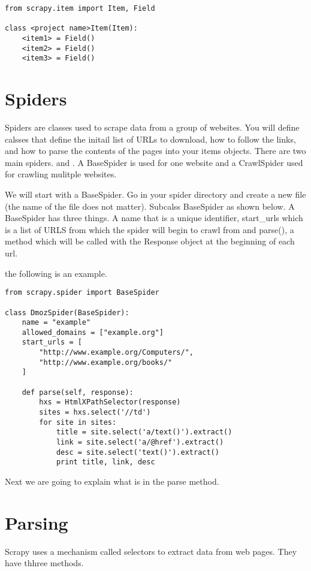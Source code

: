 \begin{lstlisting}
from scrapy.item import Item, Field

class <project name>Item(Item):
    <item1> = Field()
    <item2> = Field()
    <item3> = Field()
\end{lstlisting}

\section*{Spiders}
Spiders are classes used to scrape data from a group of websites. You will define calsses that define the initail list of URLs to download, how to follow the links, and how to parse the contents of the pages into your items objects. There are two main spiders.  and . A BaseSpider is used for one website and a CrawlSpider used for crawling mulitple websites.

We will start with a BaseSpider. Go in your spider directory and create a new file (the name of the file does not matter). Subcalss BaseSpider as shown below. A BaseSpider has three things. A name that is a unique identifier, start_urls which is a list of URLS from which the spider will begin to crawl from and parse(), a method which will be called with the Response object at the beginning of each url.

the following is an example.
\begin{lstlisting}
from scrapy.spider import BaseSpider

class DmozSpider(BaseSpider):
    name = "example"
    allowed_domains = ["example.org"]
    start_urls = [
        "http://www.example.org/Computers/",
        "http://www.example.org/books/"
    ]

    def parse(self, response):
        hxs = HtmlXPathSelector(response)
        sites = hxs.select('//td')
        for site in sites:
            title = site.select('a/text()').extract()
            link = site.select('a/@href').extract()
            desc = site.select('text()').extract()
            print title, link, desc
\end{lstlisting}

Next we are going to explain what is in the parse method.

\section*{Parsing}
Scrapy uses a mechanism called selectors to extract data from web pages.
They have thhree methods.

